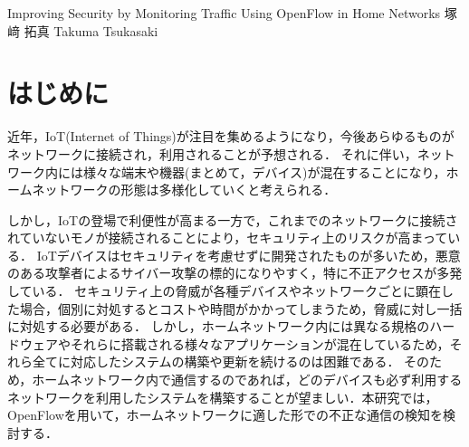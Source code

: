 \documentclass[a4paper,10pt,twocolumn,uplatex]{jsarticle}
\date{9}
\begin{document}
{Improving Security by Monitoring Traffic Using OpenFlow in Home Networks}
{塚﨑 拓真}
{Takuma Tsukasaki}

\section{はじめに}
近年，IoT(Internet of Things)が注目を集めるようになり，今後あらゆるものがネットワークに接続され，利用されることが予想される．
それに伴い，ネットワーク内には様々な端末や機器(まとめて，デバイス)が混在することになり，ホームネットワークの形態は多様化していくと考えられる．\par
しかし，IoTの登場で利便性が高まる一方で，これまでのネットワークに接続されていないモノが接続されることにより，セキュリティ上のリスクが高まっている\cite{guideline}．
IoTデバイスはセキュリティを考慮せずに開発されたものが多いため，悪意のある攻撃者によるサイバー攻撃の標的になりやすく，特に不正アクセスが多発している．
セキュリティ上の脅威が各種デバイスやネットワークごとに顕在した場合，個別に対処するとコストや時間がかかってしまうため，脅威に対し一括に対処する必要がある．
しかし，ホームネットワーク内には異なる規格のハードウェアやそれらに搭載される様々なアプリケーションが混在しているため，それら全てに対応したシステムの構築や更新を続けるのは困難である．
そのため，ホームネットワーク内で通信するのであれば，どのデバイスも必ず利用するネットワークを利用したシステムを構築することが望ましい．本研究では，OpenFlowを用いて，ホームネットワークに適した形での不正な通信の検知を検討する．

\end{document}
